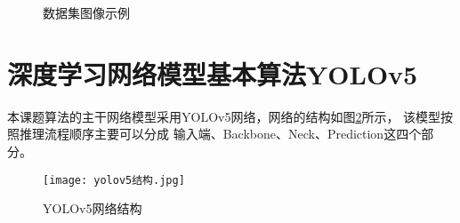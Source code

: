 \begin{figure}[!h]
    \setlength{\subfigcapskip}{-1bp}

    \centering
    \begin{minipage}{\textwidth}
    \centering
    \subfigure{\label{dataset11}}\addtocounter{subfigure}{-2}
    \hspace{2em}
    \subfigure{\label{dataset12}}\addtocounter{subfigure}{-2}
    \end{minipage}

    \centering
    \begin{minipage}{\textwidth}
    \centering
    \subfigure{\label{dataset21}}\addtocounter{subfigure}{-2}
    \hspace{2em}
    \subfigure{\label{dataset22}}\addtocounter{subfigure}{-2}
    \end{minipage}

    \centering
    \begin{minipage}{\textwidth}
    \centering
    \subfigure{\label{dataset31}}\addtocounter{subfigure}{-2}
    \hspace{2em}
    \subfigure{\label{dataset32}}\addtocounter{subfigure}{-2}
    \end{minipage}

    \vspace{0.2em}
    \caption{数据集图像示例}
    {\label{dataset}}
\end{figure}


\section{深度学习网络模型基本算法YOLOv5}
本课题算法的主干网络模型采用YOLOv5网络，网络的结构如图\ref{yolo1}所示，
该模型按照推理流程顺序主要可以分成
输入端、Backbone、Neck、Prediction这四个部分。

\begin{figure}[h]
    \centering
    \texttt{[image: yolov5结构.jpg]}
    \caption{YOLOv5网络结构}
    \label{yolo1}
\end{figure}

